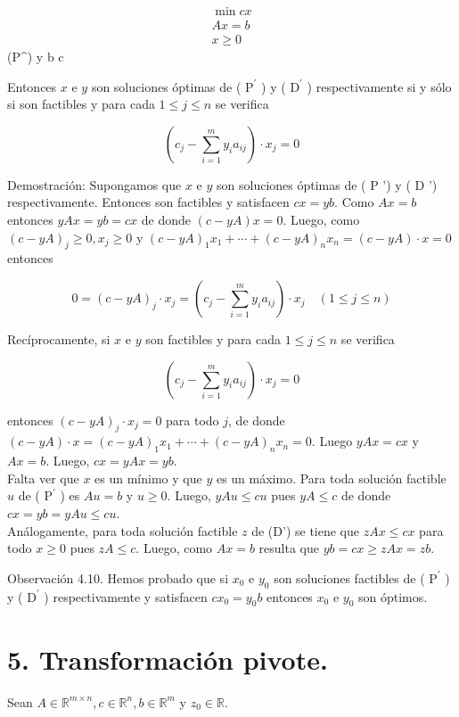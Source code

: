 \documentclass[10pt]{article}
\begin{document}
\begin{gather*}
\min c x \\
A x=b  \tag{$\prime$}\\
x \geq 0
\end{gather*} \quad\left(P^{\prime}\right) \quad \max y b c


Entonces $x$ e $y$ son soluciones óptimas de ( $\mathrm{P}^{\prime}$ ) y ( $\mathrm{D}^{\prime}$ ) respectivamente si y sólo si son factibles y para cada $1 \leq j \leq n$ se verifica

$$
\left(c_{j}-\sum_{i=1}^{m} y_{i} a_{i j}\right) \cdot x_{j}=0
$$

Demostración: Supongamos que $x$ e $y$ son soluciones óptimas de ( P ') y ( D ') respectivamente. Entonces son factibles y satisfacen $c x=y b$. Como $A x=b$ entonces $y A x=y b=c x$ de donde $(c-y A) x=0$. Luego, como $(c-y A)_{j} \geq 0, x_{j} \geq 0$ y $(c-y A)_{1} x_{1}+\cdots+(c-y A)_{n} x_{n}=(c-y A) \cdot x=0$ entonces

$$
0=(c-y A)_{j} \cdot x_{j}=\left(c_{j}-\sum_{i=1}^{m} y_{i} a_{i j}\right) \cdot x_{j} \quad(1 \leq j \leq n)
$$

Recíprocamente, si $x$ e $y$ son factibles y para cada $1 \leq j \leq n$ se verifica

$$
\left(c_{j}-\sum_{i=1}^{m} y_{i} a_{i j}\right) \cdot x_{j}=0
$$

entonces $(c-y A)_{j} \cdot x_{j}=0$ para todo $j$, de donde $(c-y A) \cdot x=(c-y A)_{1} x_{1}+\cdots+(c-y A)_{n} x_{n}=0$. Luego $y A x=c x$ y $A x=b$. Luego, $c x=y A x=y b$.\\
Falta ver que $x$ es un mínimo y que $y$ es un máximo. Para toda solución factible $u$ de ( $\mathrm{P}^{\prime}$ ) es $A u=b$ y $u \geq 0$. Luego, $y A u \leq c u$ pues $y A \leq c$ de donde $c x=y b=y A u \leq c u$.\\
Análogamente, para toda solución factible $z$ de (D') se tiene que $z A x \leq c x$ para todo $x \geq 0$ pues $z A \leq c$. Luego, como $A x=b$ resulta que $y b=c x \geq z A x=z b$.

Observación 4.10. Hemos probado que si $x_{0}$ e $y_{0}$ son soluciones factibles de ( $\mathrm{P}^{\prime}$ ) y ( $\mathrm{D}^{\prime}$ ) respectivamente y satisfacen $c x_{0}=y_{0} b$ entonces $x_{0}$ e $y_{0}$ son óptimos.

\section*{5. Transformación pivote.}
Sean $A \in \mathbb{R}^{m \times n}, c \in \mathbb{R}^{n}, b \in \mathbb{R}^{m}$ y $z_{0} \in \mathbb{R}$.
\end{document}

